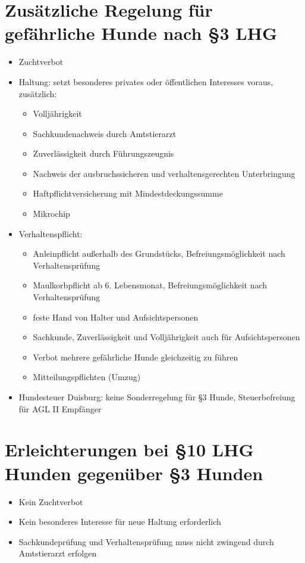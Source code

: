 \section{Zusätzliche Regelung für gefährliche Hunde nach §3 LHG}
    \begin{itemize}
        \item Zuchtverbot
        \item Haltung: setzt besonderes privates oder öffentlichen Interesses voraus, zusätzlich:
        \begin{itemize}
            \item Volljährigkeit
            \item Sachkundenachweis durch Amtstierarzt
            \item Zuverlässigkeit durch Führungszeugnis
            \item Nachweis der ausbruchssicheren und verhaltensgerechten Unterbringung
            \item Haftpflichtversicherung mit Mindestdeckungssumme
            \item Mikrochip
        \end{itemize}
        \item Verhaltenspflicht:
        \begin{itemize}
            \item Anleinpflicht außerhalb des Grundstücks, Befreiungsmöglichkeit nach Verhaltensprüfung
            \item Maulkorbpflicht ab 6. Lebensmonat, Befreiungsmöglichkeit nach Verhaltensprüfung
            \item \glqq feste\grqq{} Hand von Halter und Aufsichtspersonen
            \item Sachkunde, Zuverlässigkeit und Volljährigkeit auch für Aufsichtspersonen
            \item Verbot mehrere gefährliche Hunde gleichzeitig zu führen
            \item Mitteilungspflichten (Umzug)
        \end{itemize}
        \item Hundesteuer Duisburg: keine Sonderregelung für §3 Hunde, Steuerbefreiung für AGL II Empfänger
    \end{itemize}

 \section{\glqq Erleichterungen\grqq{} bei §10 LHG Hunden gegenüber §3 Hunden}
    \begin{itemize}
           \item Kein Zuchtverbot
           \item Kein besonderes Interesse für neue Haltung erforderlich
           \item Sachkundeprüfung und Verhaltensprüfung muss nicht zwingend durch Amtstierarzt erfolgen
       \end{itemize}


